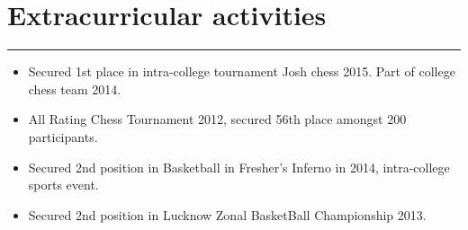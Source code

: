 \documentclass[a4paper]{article}
\begin{document}
\section*{Extracurricular activities}
\hrule
\vspace{3mm}
\begin{itemize}
	\setlength\itemsep{-0.7mm}
	\item Secured 1st place in intra-college tournament Josh chess 2015. Part of college chess team 2014.
	\item All Rating Chess Tournament 2012, secured 56th place amongst 200 participants.
	\item Secured 2nd position in Basketball in Fresher’s Inferno in 2014, intra-college sports event.
	\item Secured 2nd position in Lucknow Zonal BasketBall Championship 2013.
\end{itemize}
\end{document}
